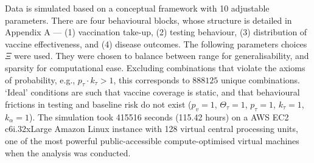 \documentclass[12pt]{article}
\begin{document}
Data is simulated based on a conceptual framework with 10 adjustable parameters. There are four behavioural blocks, whose structure is detailed in Appendix A --- (1) vaccination take-up, (2) testing behaviour, (3) distribution of vaccine effectiveness, and (4) disease outcomes. The following parameters choices $\Xi$ were used. They were chosen to balance between range for generalisability, and sparsity for computational ease. Excluding combinations that violate the axioms of probability, e.g., $p_\tau \cdot k_\tau > 1$, this corresponds to $888125$ unique combinations. `Ideal' conditions are such that vaccine coverage is static, and that behavioural frictions in testing and baseline risk do not exist ($p_v=1$, $\Theta_{\tau}=1$, $p_{\tau}=1$, $k_{\tau}=1$, $k_{\alpha}=1$). The simulation took 415516 seconds (115.42 hours) on a AWS EC2 c6i.32xLarge Amazon Linux instance with 128 virtual central processing units, one of the most powerful public-accessible compute-optimised virtual machines when the analysis was conducted.
\end{document}
